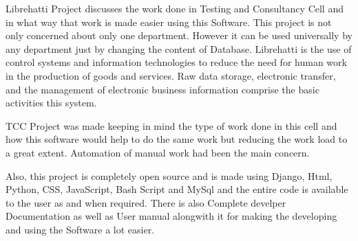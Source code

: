 \begin{Large}
\end{Large}
Librehatti Project discusses the work done in Testing and 
Consultancy Cell and in what way that work is made easier using this 
Software. This project is not only concerned about only one department. 
However it can be used universally by any department just by changing 
the content of Database. Librehatti is the use of control systems and 
information technologies to reduce the need for human work in the 
production of goods and services. Raw data storage, electronic transfer, 
and the management of electronic business information comprise the basic 
activities this system.

TCC Project was made keeping in mind the type of work done in this cell 
and how this software would help to do the same work but reducing the 
work load to a great extent. Automation of manual work had been the 
main concern.

Also, this project is completely open source and is made using Django,
Html, Python, CSS, JavaScript, Bash Script and MySql and the entire 
code is available to the user as and when required. There is also 
Complete develper Documentation as well as User manual alongwith it 
for making the developing and using the Software a lot easier.
